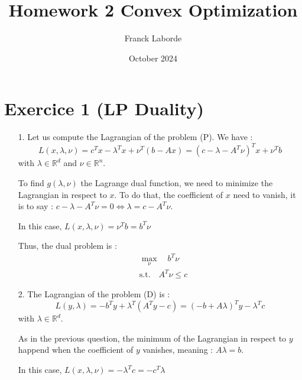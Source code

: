\documentclass{article}
\title{Homework 2 Convex Optimization}
\author{Franck Laborde}
\date{October 2024}
\begin{document}
\maketitle

\section*{Exercice 1 (LP Duality)}
    \begin{itemize}
        \item [1.] Let us compute the Lagrangian of the problem (P). We have : \begin{equation}
            L(x,\lambda, \nu)=c^Tx-\lambda^Tx+\nu^T(b-Ax) = (c-\lambda-A^T\nu)^Tx+\nu^Tb
        \end{equation}
        with $\lambda\in \mathbb{R}^d$ and $\nu\in\mathbb{R}^n$.
        
        To find $g(\lambda, \nu)$ the Lagrange dual function, we need to minimize the Lagrangian in respect to $x$. To do that, the coefficient of $x$ need to vanish, it is to say : $c-\lambda-A^T\nu = 0 \Leftrightarrow \lambda=c-A^T\nu$.
        
        In this case, $L(x,\lambda,\nu)=\nu^Tb = b^T\nu$

        Thus, the dual problem is :
        \begin{equation}
            \begin{aligned}
                &\max_{\nu} \quad b^T\nu \\
                &\text{s.t.} \quad A^T\nu\leq c
            \end{aligned}
        \end{equation}

        \item[2.] The Lagrangian of the problem (D) is : 
        \begin{equation}
            L(y,\lambda) = -b^Ty+\lambda^T(A^Ty-c)=(-b+A\lambda)^Ty-\lambda^Tc
        \end{equation}
        with $\lambda\in\mathbb{R}^d$.

        As in the previous question, the minimum of the Lagrangian in respect to $y$ happend when the coefficient of $y$ vanishes, meaning : $A\lambda=b$. 

        In this case, $L(x, \lambda, \nu)=-\lambda^Tc = -c^T\lambda$


\end{itemize}
\end{document}
